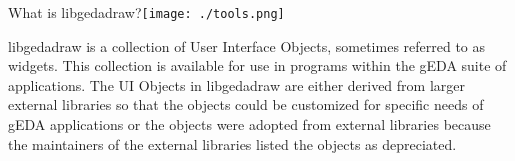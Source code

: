   What is libgedadraw?\texttt{[image: ./tools.png]}

  libgedadraw is a collection of User Interface Objects, sometimes referred to as widgets.
  This collection is available for use in programs within the gEDA suite of applications.
  The UI Objects in libgedadraw are either derived from larger external libraries so
  that the objects could be customized for specific needs of gEDA applications or the
  objects were adopted from external libraries because the maintainers of the external
  libraries listed the objects as depreciated.

